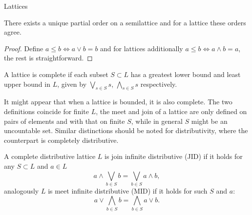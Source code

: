 \begin{subsection}{Lattices}
    \begin{proposition}
        There exists a unique partial order on a semilattice and for a lattice these orders agree.
    \end{proposition}
    \begin{proof}
        Define \( a \leq b \iff a \vee b = b \) and for lattices additionally \( a \leq b \iff a \wedge b = a \), 
        the rest is straightforward. 
    \end{proof}

    \begin{definition}
        A lattice is complete if each subset \( S \subset L \) has a greatest lower bound and least upper bound in \( L \),
        given by \( \bigvee_{s \in S} s \), \( \bigwedge_{s \in S} s \) respectively.
    \end{definition}
    It might appear that when a lattice is bounded, it is also complete. The two definitions coincide
    for finite \( L \), the meet and join of a lattice are only defined on pairs of elements and with that on finite \( S \), 
    while in general \( S \) might be an uncountable set. Similar distinctions should be noted for distributivity, where the counterpart 
    is completely distributive.

    \begin{definition}
        A complete distributive lattice \( L \) is join infinite distributive (JID) if it holds for any \( S \subset L \) and \( a \in L \)
        \[
            a \wedge \bigvee_{b \in S} b = \bigvee_{b \in S} a \wedge b,
        \]
        analogously \( L \) is meet infinite distributive (MID) if it holds for such \( S \) and \( a \):
        \[
            a \vee \bigwedge_{b \in S} b = \bigwedge_{b \in S} a \vee b.
        \]
    \end{definition}


\end{subsection}
